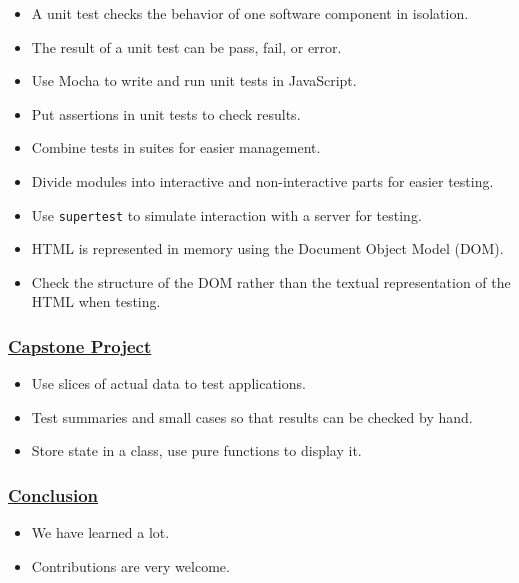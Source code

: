\begin{itemize}
\tightlist
\item
  A unit test checks the behavior of one software component in
  isolation.
\item
  The result of a unit test can be pass, fail, or error.
\item
  Use Mocha to write and run unit tests in JavaScript.
\item
  Put assertions in unit tests to check results.
\item
  Combine tests in suites for easier management.
\item
  Divide modules into interactive and non-interactive parts for easier
  testing.
\item
  Use \texttt{supertest} to simulate interaction with a server for
  testing.
\item
  HTML is represented in memory using the Document Object Model (DOM).
\item
  Check the structure of the DOM rather than the textual representation
  of the HTML when testing.
\end{itemize}

\subsubsection{\texorpdfstring{\protect\hyperlink{s:capstone}{Capstone
Project}}{Capstone Project}}\label{null}

\begin{itemize}
\tightlist
\item
  Use slices of actual data to test applications.
\item
  Test summaries and small cases so that results can be checked by hand.
\item
  Store state in a class, use pure functions to display it.
\end{itemize}

\subsubsection{\texorpdfstring{\protect\hyperlink{s:finale}{Conclusion}}{Conclusion}}\label{null}

\begin{itemize}
\tightlist
\item
  We have learned a lot.
\item
  Contributions are very welcome.
\end{itemize}

